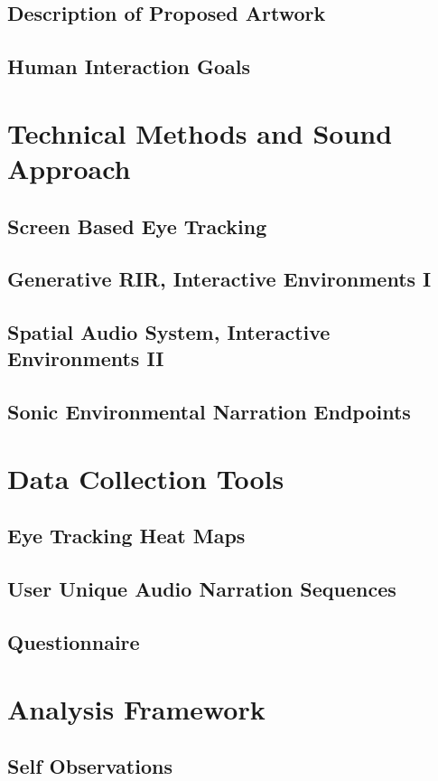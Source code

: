 \documentclass[a4paper, 12pt]{report}
\begin{document}
        \subsection{Description of Proposed Artwork}
        \subsection{Human Interaction Goals}
    \section{Technical Methods and Sound Approach}
        \subsection{Screen Based Eye Tracking}
        \subsection{Generative RIR, Interactive Environments I}
        \subsection{Spatial Audio System, Interactive Environments II}
        \subsection{Sonic Environmental Narration Endpoints}
    \section{Data Collection Tools}
        \subsection{Eye Tracking Heat Maps}
        \subsection{User Unique Audio Narration Sequences}
        \subsection{Questionnaire}
    \section{Analysis Framework}
        \subsection{Self Observations}
\end{document}

